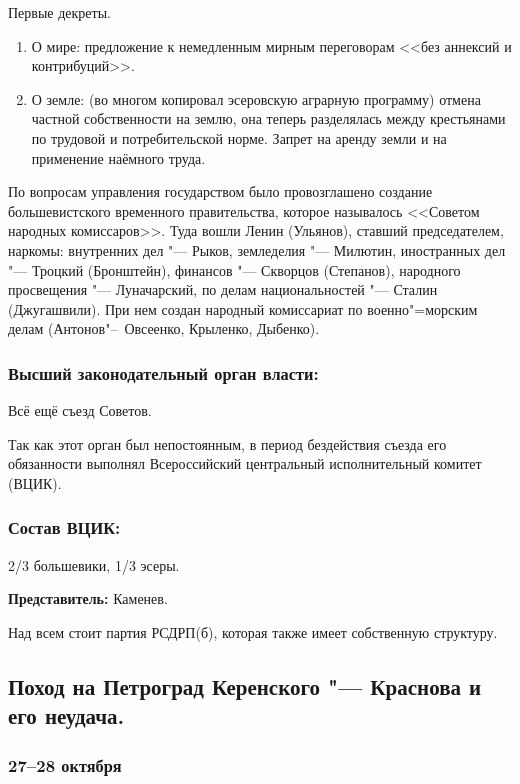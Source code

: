 Первые декреты.

\begin{enumerate}
    \item О мире: предложение к немедленным мирным переговорам <<без аннексий и контрибуций>>. 
    \item О земле: (во многом копировал эсеровскую аграрную программу) отмена частной собственности на землю, она теперь разделялась между крестьянами по трудовой и потребительской норме. Запрет на аренду земли и на применение наёмного труда.
\end{enumerate}

По вопросам управления государством было провозглашено создание большевистского временного правительства, которое называлось <<Советом народных комиссаров>>. Туда вошли Ленин (Ульянов), ставший председателем, наркомы: внутренних дел "--- Рыков, земледелия "--- Милютин, иностранных дел "--- Троцкий (Бронштейн), финансов "--- Скворцов (Степанов), народного просвещения "--- Луначарский, по делам национальностей "--- Сталин (Джугашвили). При нем создан народный комиссариат по военно"=морским делам (Антонов"--~Овсеенко, Крыленко, Дыбенко).

\subsubsection{\textbf{Высший законодательный орган власти:}}

Всё ещё съезд Советов.

Так как этот орган был непостоянным, в период бездействия съезда его обязанности выполнял Всероссийский центральный исполнительный комитет (ВЦИК).

\subsubsection{\textbf{Состав ВЦИК:}}

2/3 большевики, 1/3 эсеры.

\textbf{Представитель:} Каменев.

Над всем стоит партия РСДРП(б), которая также имеет собственную структуру.

\subsection{Поход на Петроград Керенского "--- Краснова и его неудача.}

\subsubsection{\textbf{27--28 октября}}

